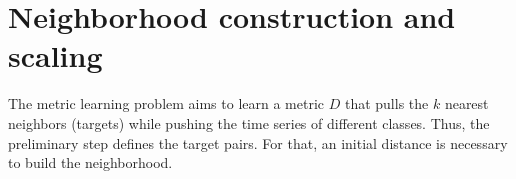 \section{Neighborhood construction and scaling}
\label{sec:neighborhood}
The metric learning problem aims to learn a metric $D$ that pulls the $k$ nearest neighbors (targets) while pushing the time series of different classes. Thus, the preliminary step defines the target pairs. For that, an initial distance is necessary to build the neighborhood. 

